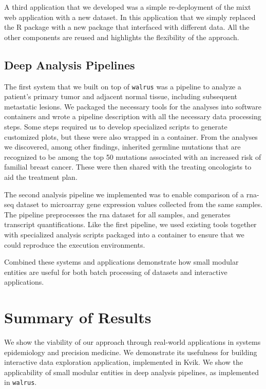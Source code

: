 A third application that we developed was a simple re-deployment of the
\gls{mixt} web application with a new dataset. In this application that we
simply replaced the R package with a new package that interfaced with different
data. All the other components are reused and highlights the flexibility of the
approach. 


\subsection{Deep Analysis Pipelines}
The first system that we built on top of \texttt{walrus} was a pipeline to
analyze a patient’s primary tumor and adjacent normal tissue, including
subsequent metastatic lesions.\cite{walrus} We packaged the necessary tools for
the analyses into software containers and wrote a pipeline description with all
the necessary data processing steps. Some steps required us to develop
specialized scripts to generate customized plots, but these were also wrapped in
a container. From the analyses we discovered, among other findings, inherited
germline mutations that are recognized to be among the top 50 mutations
associated with an increased risk of familial breast cancer. These were then
shared with the treating oncologists to aid the treatment plan. 

The second analysis pipeline we implemented was to enable comparison of a
\gls{rna}-seq dataset to microarray gene expression values collected from the
same samples.  The pipeline preprocesses the \gls{rna} dataset for all samples,
and generates transcript quantifications. Like the first pipeline, we used
existing tools together with specialized analysis scripts packaged into a
container to ensure that we could reproduce the execution environments. 

Combined these systems and applications demonstrate how small modular entities
are useful for both batch processing of datasets and interactive
applications. 

\section{Summary of Results} 
We show the viability of our approach through real-world applications in systems
epidemiology and precision medicine. We demonstrate its usefulness for building
interactive data exploration application, implemented in Kvik. We show the
applicability of small modular entities in deep analysis pipelines, as
implemented in \texttt{walrus}.


